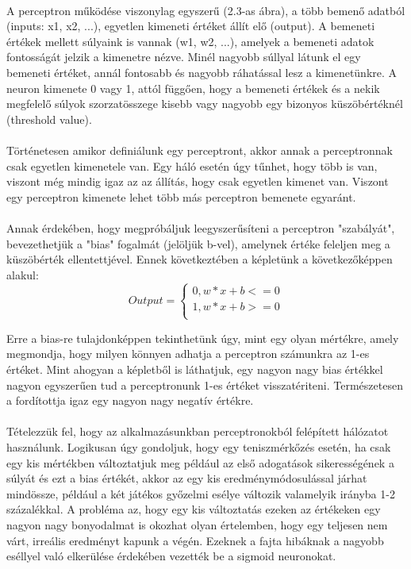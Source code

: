 \paragraph{}
A perceptron működése viszonylag egyszerű (2.3-as ábra), a több bemenő adatból (inputs: x1, x2, ...), egyetlen kimeneti értéket állít elő (output). A bemeneti értékek mellett súlyaink is vannak (w1, w2, ...), amelyek a bemeneti adatok fontosságát jelzik a kimenetre nézve. Minél nagyobb súllyal látunk el egy bemeneti értéket, annál fontosabb és nagyobb ráhatással lesz a kimenetünkre. A neuron kimenete 0 vagy 1, attól függően, hogy a bemeneti értékek és a nekik megfelelő súlyok szorzatösszege kisebb vagy nagyobb egy bizonyos küszöbértéknél (threshold value).

\paragraph{}
Történetesen amikor definiálunk egy perceptront, akkor annak a perceptronnak csak egyetlen kimenetele van. Egy háló esetén úgy tűnhet, hogy több is van, viszont még mindig igaz az az állítás, hogy csak egyetlen kimenet van. Viszont egy perceptron kimenete lehet több más perceptron bemenete egyaránt.

\paragraph{}
Annak érdekében, hogy megpróbáljuk leegyszerűsíteni a perceptron "szabályát", bevezethetjük a "bias" fogalmát (jelöljük b-vel), amelynek értéke feleljen meg a küszöbérték ellentettjével. Ennek következtében a képletünk a következőképpen alakul:
\[ 
Output= \left\{
\begin{array}{ll}
      0, w*x + b <= 0 \\
      1, w*x + b >= 0 \\
\end{array} 
\right. 
\]

Erre a bias-re tulajdonképpen tekinthetünk úgy, mint egy olyan mértékre, amely megmondja, hogy milyen könnyen adhatja a perceptron számunkra az 1-es értéket. Mint ahogyan a képletből is láthatjuk, egy nagyon nagy bias értékkel nagyon egyszerűen tud a perceptronunk 1-es értéket visszatériteni. Természetesen a fordítottja igaz egy nagyon nagy negatív értékre.

\paragraph{}
Tételezzük fel, hogy az alkalmazásunkban perceptronokból felépített hálózatot használunk. Logikusan úgy gondoljuk, hogy egy teniszmérkőzés esetén, ha csak egy kis mértékben változtatjuk meg például az első adogatások sikerességének a súlyát és ezt a bias értékét, akkor az egy kis eredménymódosulással járhat mindössze, például a két játékos győzelmi esélye változik valamelyik irányba 1-2 százalékkal. A probléma az, hogy egy kis változtatás ezeken az értékeken egy nagyon nagy bonyodalmat is okozhat olyan értelemben, hogy egy teljesen nem várt, irreális eredményt kapunk a végén. Ezeknek a fajta hibáknak a nagyobb eséllyel való elkerülése érdekében vezették be a sigmoid neuronokat.

